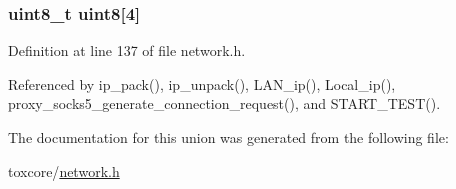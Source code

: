 \hypertarget{union_i_p4_a73b9a57544f1edd6e2187aca636c75ef}{
\subsubsection[{uint8}]{\setlength{\rightskip}{0pt plus 5cm}uint8\+\_\+t uint8\mbox{[}4\mbox{]}}}\label{union_i_p4_a73b9a57544f1edd6e2187aca636c75ef}


Definition at line 137 of file network.\+h.



Referenced by ip\+\_\+pack(), ip\+\_\+unpack(), L\+A\+N\+\_\+ip(), Local\+\_\+ip(), proxy\+\_\+socks5\+\_\+generate\+\_\+connection\+\_\+request(), and S\+T\+A\+R\+T\+\_\+\+T\+E\+S\+T().



The documentation for this union was generated from the following file\+:\begin{DoxyCompactItemize}
\item 
toxcore/\hyperlink{network_8h}{network.\+h}\end{DoxyCompactItemize}
